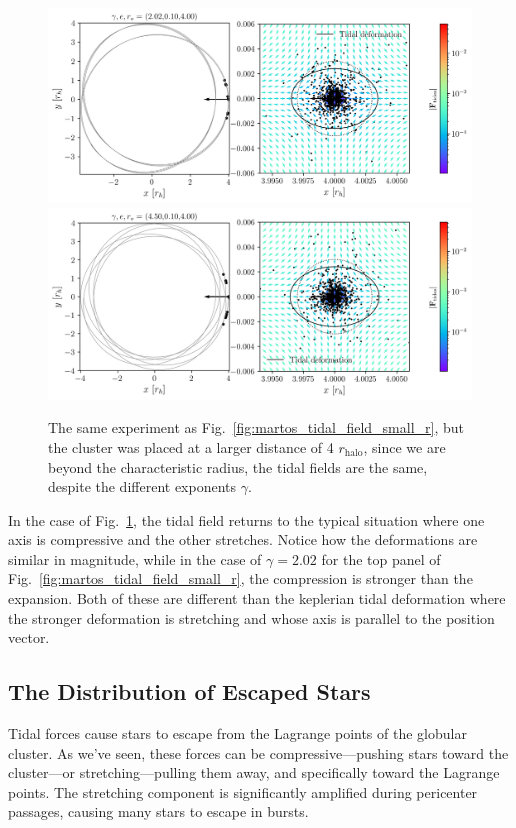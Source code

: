             \begin{figure}
                \includegraphics[width=\linewidth]{images/martos_tidal_field_202_10_400.png}
                \includegraphics[width=\linewidth]{images/martos_tidal_field_450_10_400.png}
                \caption{The same experiment as Fig.~\ref{fig:martos_tidal_field_small_r}, but the cluster was placed at a larger distance of 4 $r_\textrm{halo}$, since we are beyond the characteristic radius, the tidal fields are the same, despite the different exponents $\gamma$.}
                \label{fig:martos_tidal_field_big_r}
            \end{figure}

            In the case of Fig.~\ref{fig:martos_tidal_field_big_r}, the tidal field returns to the typical situation where one axis is compressive and the other stretches. Notice how the deformations are similar in magnitude, while in the case of $\gamma=2.02$ for the top panel of Fig.~\ref{fig:martos_tidal_field_small_r}, the compression is stronger than the expansion. Both of these are different than the keplerian tidal deformation where the stronger deformation is stretching and whose axis is parallel to the position vector. 

    \subsection{The Distribution of Escaped Stars}
        Tidal forces cause stars to escape from the Lagrange points of the globular cluster. As we've seen, these forces can be compressive—pushing stars toward the cluster—or stretching—pulling them away, and specifically toward the Lagrange points. The stretching component is significantly amplified during pericenter passages, causing many stars to escape in bursts.

